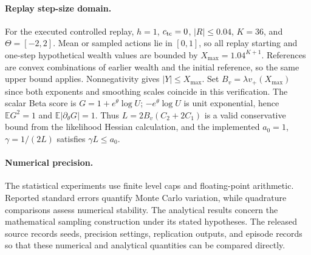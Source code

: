 \documentclass[11pt]{article}
\newcommand{\E}{\mathbb E}
\newcommand{\1}{\mathbf 1}
\begin{document}
\paragraph{Replay step-size domain.}
For the executed controlled replay, $h=1$, $c_{\rm tc}=0$, $|R|\le0.04$, $K=36$, and $\Theta=[-2,2]$. Mean or sampled actions lie in $[0,1]$, so all replay starting and one-step hypothetical wealth values are bounded by $X_{\max}=1.04^{K+1}$. References are convex combinations of earlier wealth and the initial reference, so the same upper bound applies. Nonnegativity gives $|Y|\le X_{\max}$. Set $B_v=\lambda v_+(X_{\max})$ since both exponents and smoothing scales coincide in this verification. The scalar Beta score is $G=1+e^\theta\log U$; $-e^\theta\log U$ is unit exponential, hence $\E G^2=1$ and $\E|\partial_\theta G|=1$. Thus $L=2B_v(C_2+2C_1)$ is a valid conservative bound from the likelihood Hessian calculation, and the implemented $a_0=1$, $\gamma=1/(2L)$ satisfies $\gamma L\le a_0$.


\paragraph{Numerical precision.}
The statistical experiments use finite level caps and floating-point arithmetic. Reported standard errors quantify Monte Carlo variation, while quadrature comparisons assess numerical stability. The analytical results concern the mathematical sampling construction under its stated hypotheses. The released source records seeds, precision settings, replication outputs, and episode records so that these numerical and analytical quantities can be compared directly.
\end{document}
